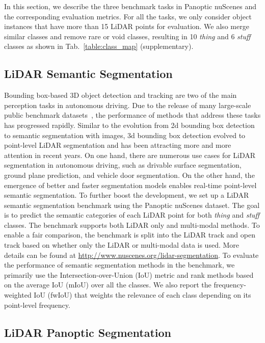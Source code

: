 \documentclass[letterpaper, 10 pt, journal, twoside]{IEEEtran}
\newcommand{\tabref}[1]{Tab.~\ref{#1}}
\begin{document}
In this section, we describe the three benchmark tasks in Panoptic nuScenes and the corresponding evaluation metrics. For all the tasks, we only consider object instances that have more than 15 LiDAR points for evaluation. We also merge similar classes and remove rare or void classes, resulting in 10 \emph{thing} and 6 \emph{stuff} classes as shown in \tabref{table:class_map} (supplementary).

\subsection{LiDAR Semantic Segmentation}

Bounding box-based 3D object detection and tracking are two of the main perception tasks in autonomous driving. Due to the release of many large-scale public benchmark datasets~\cite{Geiger2013IJRR,caesar2020nuscenes,sun2020scalability}, the performance of methods that address these tasks has progressed rapidly. Similar to the evolution from 2d bounding box detection to semantic segmentation with images, 3d bounding box detection evolved to point-level LiDAR segmentation and has been attracting more and more attention in recent years. On one hand, there are numerous use cases for LiDAR segmentation in autonomous driving, such as drivable surface segmentation, ground plane prediction, and vehicle door segmentation. On the other hand, the emergence of better and faster segmentation models enables real-time point-level semantic segmentation. To further boost the development, we set up a LiDAR semantic segmentation benchmark using the Panoptic nuScenes dataset. The goal is to predict the semantic categories of each LiDAR point for both \emph{thing} and \emph{stuff} classes. The benchmark supports both LiDAR only and multi-modal methods. To enable a fair comparison, the benchmark is split into the LiDAR track and open track based on whether only the LiDAR or multi-modal data is used. More details can be found at \url{http://www.nuscenes.org/lidar-segmentation}. To evaluate the performance of semantic segmentation methods in the benchmark, we primarily use the Intersection-over-Union (IoU) metric and rank methods based on the average IoU (mIoU) over all the classes. We also report the frequency-weighted IoU (fwIoU) that weights the relevance of each class depending on its point-level frequency.

\subsection{LiDAR Panoptic Segmentation}
\end{document}
